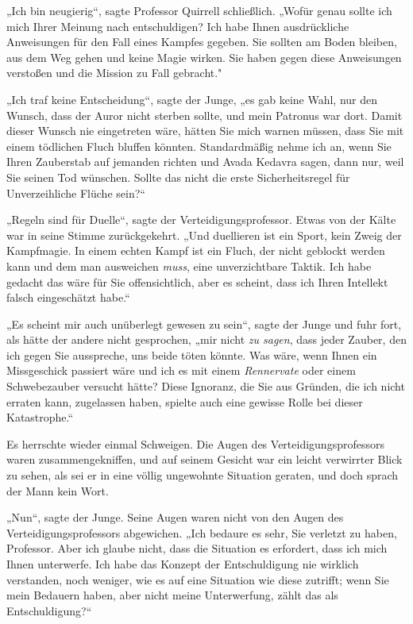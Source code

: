{„Ich bin neugierig“, sagte Professor Quirrell schließlich. „Wofür genau sollte ich mich Ihrer Meinung nach entschuldigen? Ich habe Ihnen ausdrückliche Anweisungen für den Fall eines Kampfes gegeben. Sie sollten am Boden bleiben, aus dem Weg gehen und keine Magie wirken. Sie haben gegen diese Anweisungen verstoßen und die Mission zu Fall gebracht."

„Ich traf keine Entscheidung“, sagte der Junge, „es gab keine Wahl, nur den Wunsch, dass der Auror nicht sterben sollte, und mein Patronus war dort. Damit dieser Wunsch nie eingetreten wäre, hätten Sie mich warnen müssen, dass Sie mit einem tödlichen Fluch bluffen könnten. Standardmäßig nehme ich an, wenn Sie Ihren Zauberstab auf jemanden richten und Avada Kedavra sagen, dann nur, weil Sie seinen Tod wünschen. Sollte das nicht die erste Sicherheitsregel für Unverzeihliche Flüche sein?“

„Regeln sind für Duelle“, sagte der Verteidigungsprofessor. Etwas von der Kälte war in seine Stimme zurückgekehrt. „Und duellieren ist ein Sport, kein Zweig der Kampfmagie. In einem echten Kampf ist ein Fluch, der nicht geblockt werden kann und dem man ausweichen \emph{muss}, eine unverzichtbare Taktik. Ich habe gedacht das wäre für Sie offensichtlich, aber es scheint, dass ich Ihren Intellekt falsch eingeschätzt habe.“

„Es scheint mir auch unüberlegt gewesen zu sein“, sagte der Junge und fuhr fort, als hätte der andere nicht gesprochen, „mir nicht \emph{zu sagen}, dass jeder Zauber, den ich gegen Sie ausspreche, uns beide töten könnte. Was wäre, wenn Ihnen ein Missgeschick passiert wäre und ich es mit einem \emph{Rennervate} oder einem Schwebezauber versucht hätte? Diese Ignoranz, die Sie aus Gründen, die ich nicht erraten kann, zugelassen haben, spielte auch eine gewisse Rolle bei dieser Katastrophe.“

Es herrschte wieder einmal Schweigen. Die Augen des Verteidigungsprofessors waren zusammengekniffen, und auf seinem Gesicht war ein leicht verwirrter Blick zu sehen, als sei er in eine völlig ungewohnte Situation geraten, und doch sprach der Mann kein Wort.

„Nun“, sagte der Junge. Seine Augen waren nicht von den Augen des Verteidigungsprofessors abgewichen. „Ich bedaure es sehr, Sie verletzt zu haben, Professor. Aber ich glaube nicht, dass die Situation es erfordert, dass ich mich Ihnen unterwerfe. Ich habe das Konzept der Entschuldigung nie wirklich verstanden, noch weniger, wie es auf eine Situation wie diese zutrifft; wenn Sie mein Bedauern haben, aber nicht meine Unterwerfung, zählt das als Entschuldigung?“

}
